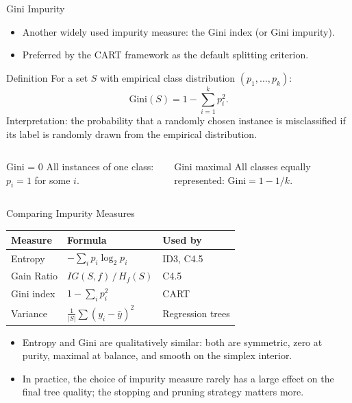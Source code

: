 \begin{frame}{Gini Impurity}
  \begin{itemize}
    \item Another widely used impurity measure: the \alert{Gini index} (or Gini impurity).
    \item Preferred by the CART framework as the default splitting criterion.
  \end{itemize}
  \begin{block}{Definition}
    For a set $S$ with empirical class distribution $(p_1, \ldots, p_k)$:
    \[
      \text{Gini}(S) = 1 - \sum_{i=1}^{k} p_i^2.
    \]
    Interpretation: the probability that a randomly chosen instance is \alert{misclassified}
    if its label is randomly drawn from the empirical distribution.
  \end{block}
  \begin{columns}[t]
      \begin{block}{Gini = 0}
        All instances of one class: $p_i = 1$ for some $i$.
      \end{block}
      \begin{block}{Gini maximal}
        All classes equally represented: $\text{Gini} = 1 - 1/k$.
      \end{block}
  \end{columns}
\end{frame}

\begin{frame}{Comparing Impurity Measures}
  \renewcommand{\arraystretch}{1.5}
  \begin{center}
  \begin{tabular}{lll}
    \toprule
    \textbf{Measure} & \textbf{Formula} & \textbf{Used by} \\
    \midrule
    Entropy & $-\sum_i p_i \log_2 p_i$ & ID3, C4.5 \\
    Gain Ratio & $IG(S,f)\,/\,H_f(S)$ & C4.5 \\
    Gini index & $1 - \sum_i p_i^2$ & CART \\
    Variance & $\frac{1}{|S|}\sum(y_i - \bar y)^2$ & Regression trees \\
    \bottomrule
  \end{tabular}
  \end{center}
  \vspace{0.4em}
  \begin{itemize}
    \item Entropy and Gini are \alert{qualitatively similar}: both are symmetric, zero at purity,
          maximal at balance, and smooth on the simplex interior.
    \item In practice, the choice of impurity measure rarely has a large effect on the
          final tree quality; the \alert{stopping and pruning} strategy matters more.
  \end{itemize}
\end{frame}

